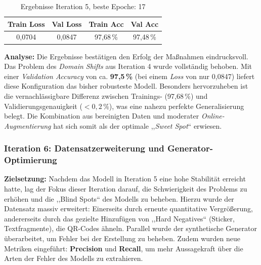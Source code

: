 \documentclass[
    a4paper,        %
    11pt,           %
    ngerman,        %
    parskip=half,   %
    listof=totoc,   %
    bibliography=totoc %
]{scrartcl}
\begin{document}
\begin{table}[H]
    \centering
    \caption{Ergebnisse Iteration 5, beste Epoche: 17}
    \label{tab:results_iter5}
    \begin{tabular}{cccc}
        \toprule
        \textbf{Train Loss} & \textbf{Val Loss} & \textbf{Train Acc} & \textbf{Val Acc} \\
        \midrule
        0,0704 & 0,0847 & 97,68\,\% & 97,48\,\% \\
        \bottomrule
    \end{tabular}
\end{table}

\textbf{Analyse:}
Die Ergebnisse bestätigen den Erfolg der Maßnahmen eindrucksvoll. Das Problem des \textit{Domain Shifts} aus Iteration 4 wurde vollständig behoben.
Mit einer \textit{Validation Accuracy} von ca. \textbf{97,5\,\%} (bei einem \textit{Loss} von nur 0,0847) liefert diese Konfiguration das bisher robusteste Modell. Besonders hervorzuheben ist die vernachlässigbare Differenz zwischen Trainings- (97,68\,\%) und Validierungsgenauigkeit ($< 0,2\,\%$), was eine nahezu perfekte Generalisierung belegt. Die Kombination aus bereinigten Daten und moderater \textit{Online-Augmentierung} hat sich somit als der optimale ,,\textit{Sweet Spot}`` erwiesen.

\subsubsection{Iteration 6: Datensatzerweiterung und Generator-Optimierung} \label{subsubsec:iter6}

\textbf{Zielsetzung:} Nachdem das Modell in Iteration 5 eine hohe Stabilität erreicht hatte, lag der Fokus dieser Iteration darauf, die Schwierigkeit des Problems zu erhöhen und die ,,Blind Spots`` des Modells zu beheben. Hierzu wurde der Datensatz massiv erweitert: Einerseits durch erneute quantitative Vergrößerung, andererseits durch das gezielte Hinzufügen von ,,Hard Negatives`` (Sticker, Textfragmente), die QR-Codes ähneln. Parallel wurde der synthetische Generator überarbeitet, um Fehler bei der Erstellung zu beheben.
Zudem wurden neue Metriken eingeführt: \textbf{Precision} und \textbf{Recall}, um mehr Aussagekraft über die Arten der Fehler des Modells zu extrahieren.
\end{document}
